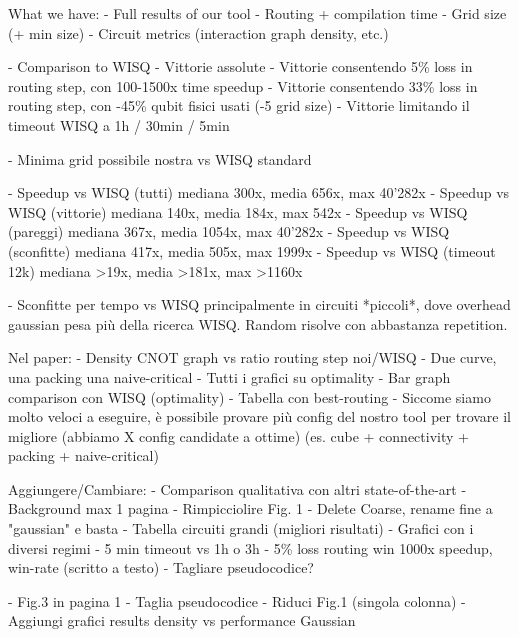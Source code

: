 What we have:
- Full results of our tool
    - Routing + compilation time
    - Grid size (+ min size)
    - Circuit metrics (interaction graph density, etc.)

- Comparison to WISQ
    - Vittorie assolute
    - Vittorie consentendo 5\% loss in routing step, con 100-1500x time speedup
    - Vittorie consentendo 33\% loss in routing step, con -45\% qubit fisici usati (-5 grid size)
    - Vittorie limitando il timeout WISQ a 1h / 30min / 5min
    
    - Minima grid possibile nostra vs WISQ standard
    
    - Speedup vs WISQ (tutti)       mediana 300x, media 656x,  max 40'282x
    - Speedup vs WISQ (vittorie)    mediana 140x, media 184x,  max 542x
    - Speedup vs WISQ (pareggi)     mediana 367x, media 1054x, max 40'282x
    - Speedup vs WISQ (sconfitte)   mediana 417x, media 505x,  max 1999x
    - Speedup vs WISQ (timeout 12k) mediana >19x, media >181x, max >1160x

    - Sconfitte per tempo vs WISQ principalmente in circuiti *piccoli*, dove overhead
      gaussian pesa più della ricerca WISQ. Random risolve con abbastanza repetition.


Nel paper:
    - Density CNOT graph vs ratio routing step noi/WISQ
        - Due curve, una packing una naive-critical
    - Tutti i grafici su optimality
    - Bar graph comparison con WISQ (optimality)
    - Tabella con best-routing
    - Siccome siamo molto veloci a eseguire, è possibile provare più config
      del nostro tool per trovare il migliore (abbiamo X config candidate a ottime)
      (es. cube + connectivity + packing + naive-critical)


Aggiungere/Cambiare:
    - Comparison qualitativa con altri state-of-the-art
    - Background max 1 pagina
    - Rimpicciolire Fig. 1
    - Delete Coarse, rename fine a "gaussian" e basta
    - Tabella circuiti grandi (migliori risultati)
    - Grafici con i diversi regimi
        - 5 min timeout vs 1h o 3h
        - 5\% loss routing win 1000x speedup, win-rate (scritto a testo)
    - Tagliare pseudocodice?

    - Fig.3 in pagina 1
    - Taglia pseudocodice
    - Riduci Fig.1 (singola colonna)
    - Aggiungi grafici results density vs performance Gaussian
    